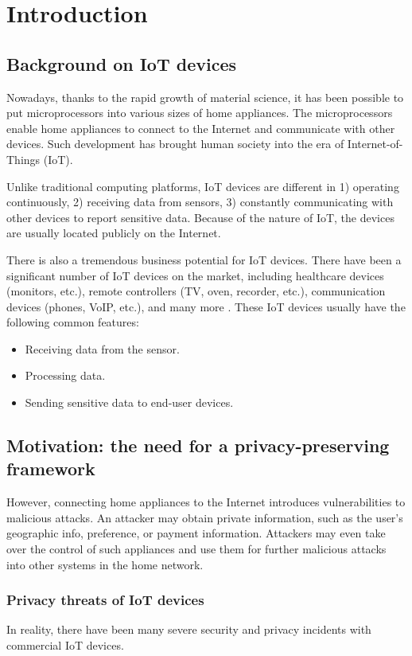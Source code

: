 \chapter{Introduction}

\section{Background on IoT devices}

Nowadays, thanks to the rapid growth of material science, it has been possible to put microprocessors into various sizes of home appliances. The microprocessors enable home appliances to connect to the Internet and communicate with other devices. Such development has brought human society into the era of Internet-of-Things (IoT). 

Unlike traditional computing platforms, IoT devices are different in 1) operating continuously, 2) receiving data from sensors, 3) constantly communicating with other devices to report sensitive data. Because of the nature of IoT, the devices are usually located publicly on the Internet. 

There is also a tremendous business potential for IoT devices. There have been a significant number of IoT devices on the market, including healthcare devices (monitors, etc.), remote controllers (TV, oven, recorder, etc.), communication devices (phones, VoIP, etc.), and many more \cite{hoang2015tor}. These IoT devices usually have the following common features:

\begin{itemize}
	\item Receiving data from the sensor.
	\item Processing data.
	\item Sending sensitive data to end-user devices. 
\end{itemize}

\section{Motivation: the need for a privacy-preserving framework}
However, connecting home appliances to the Internet introduces vulnerabilities to malicious attacks. An attacker may obtain private information, such as the user's geographic info, preference, or payment information. Attackers may even take over the control of such appliances and use them for further malicious attacks into other systems in the home network. 

\subsection{Privacy threats of IoT devices}
In reality, there have been many severe security and privacy incidents with commercial IoT devices.

